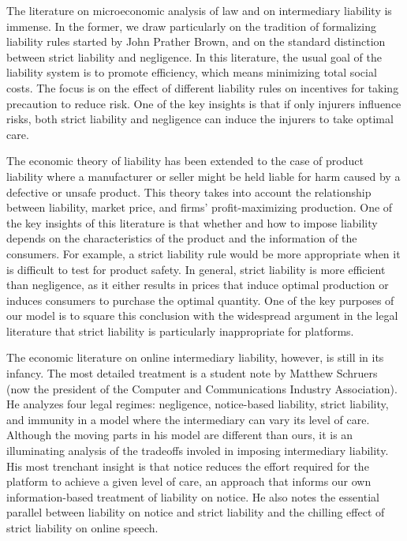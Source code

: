 \label{sec:background}

The literature on microeconomic analysis of law and on intermediary liability is immense. In the former, we draw particularly on the tradition of formalizing liability rules started by John Prather Brown, and on the standard distinction between strict liability and negligence. In this literature, the usual goal of the liability system is to promote efficiency, which means minimizing total social costs. The focus is on the effect of different liability rules on incentives for taking precaution to reduce risk. One of the key insights is that if only injurers influence risks, both strict liability and negligence can induce the injurers to take optimal care.  

The economic theory of liability has been extended to the case of product liability where a manufacturer or seller might be held liable for harm caused by a defective or unsafe product.  This theory takes into account the relationship between liability, market price, and firms' profit-maximizing production. One of the key insights of this literature is that whether and how to impose liability depends on the characteristics of the product and the information of the consumers.   For example, a strict liability rule would be more appropriate when it is difficult to test for product safety. In general, strict liability is more efficient than negligence, as it either results in prices that induce optimal production or induces consumers to purchase the optimal quantity. One of the key purposes of our model is to square this conclusion with the widespread argument in the legal literature that strict liability is particularly inappropriate for platforms.

The economic literature on online intermediary liability, however, is still in its infancy. The most detailed treatment is a student note by Matthew Schruers (now the president of the Computer and Communications Industry Association). He analyzes four legal regimes: negligence, notice-based liability, strict liability, and immunity in a model where the intermediary can vary its level of care. Although the moving parts in his model are different than ours, it is an illuminating analysis of the tradeoffs involed in imposing intermediary liability. His most trenchant insight is that notice reduces the effort required for the platform to achieve a given level of care, an approach that informs our own information-based treatment of liability on notice. He also notes the essential parallel between liability on notice and strict liability and the chilling effect of strict liability on online speech. 

